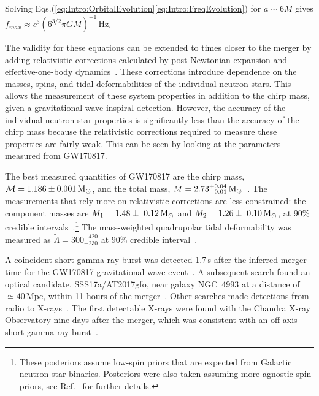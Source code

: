 \documentclass[../Thesis.tex]{subfiles}
\begin{document}
    Solving Eqs.(\ref{eq:Intro:OrbitalEvolution}\Hyphdash*\ref{eq:Intro:FreqEvolution}) for $a \sim 6M$ gives $f_{max}\approx c^3 ( 6^{3/2}\pi G M )^{-1}\,\mathrm{Hz}$.
    \par

    The validity for these equations can be extended to times closer to the merger by adding relativistic corrections calculated by post-Newtonian expansion and effective-one-body dynamics~\cite{Cutler1994,Blanchet1995, Buonanno1999,Droz1999,Damour2012,Yagi2013,Blanchet2014}. %
    These corrections introduce dependence on the masses, spins, and tidal deformabilities of the individual neutron stars.
    This allows the measurement of these system properties in addition to the chirp mass, given a gravitational-wave inspiral detection.
    However, the accuracy of the individual neutron star properties is significantly less than the accuracy of the chirp mass because the relativistic corrections required to measure these properties are fairly weak. 
    This can be seen by looking at the parameters measured from GW170817.

    \par
    The best measured quantities of GW170817 are the chirp mass, $\mathcal{M}=1.186\pm 0.001\,\mathrm{M}_{\odot}$, and the total mass, $M=2.73^{+0.04}_{-0.01}\,\mathrm{M}_{\odot}$~\cite{GW170817Properties}.
    The measurements that rely more on relativistic corrections are less constrained: the component masses are $M_1 = 1.48\pm~0.12\,\mathrm{M}_{\odot}$ and $M_2=1.26\pm~0.10\,\mathrm{M}_{\odot}$, at 90\% credible intervals~\cite{GW170817Properties}.\footnote{These posteriors assume low-spin priors that are expected from Galactic neutron star binaries. Posteriors were also taken assuming more agnostic spin priors, see Ref.~\cite{GW170817Properties} for further details.}
    The mass-weighted quadrupolar tidal deformability was measured as $\tilde{\Lambda}=300^{+420}_{-230}$ at 90\% credible interval~\cite{GW170817Properties}.\par
  
    A coincident short gamma-ray burst was detected 1.7\,s after the inferred merger time for the GW170817 gravitational-wave event~\cite{Goldstein2017,GW170817Detection}. 
    A subsequent search found an optical candidate, SSS17a/AT2017gfo, near galaxy NGC~4993 at a distance of $\simeq 40\,$Mpc, within 11 hours of the merger~\cite{Coulter2017}.
    Other searches made detections from radio to X-rays~\cite[e.g.,][]{Troja2017,Nicholl2017,Chornock2017,Margutti2017,Alexander2017}.
    The first detectable X-rays were found with the Chandra X-ray Observatory nine days after the merger, which was consistent with an off-axis short gamma-ray burst~\cite{Troja2017}. \par
    
\end{document}
